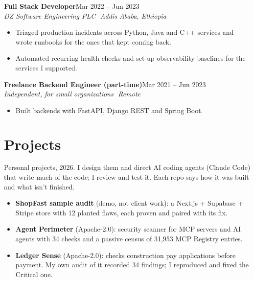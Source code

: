 \documentclass[10pt,letterpaper]{article}
\newcommand{\sep}{\,\textperiodcentered\,}
\newcommand{\role}[3]{%
  \textbf{#1}\hfill{\small #2}\\
  {\small\itshape #3}\par\vspace{1pt}}
\begin{document}
\role{Full Stack Developer}{Mar 2022 -- Jun 2023}{DZ Software Engineering PLC \sep Addis Ababa, Ethiopia}
\begin{itemize}
  \item Triaged production incidents across Python, Java and C++ services and wrote runbooks for the
  ones that kept coming back.
  \item Automated recurring health checks and set up observability baselines for
  the services I supported.
\end{itemize}
\vspace{1pt}

\role{Freelance Backend Engineer (part-time)}{Mar 2021 -- Jun 2023}{Independent, for small organizations \sep Remote}
\begin{itemize}
  \item Built backends with FastAPI, Django REST and Spring Boot.
\end{itemize}

\section{Projects}
{\small Personal projects, 2026. I design them and direct AI coding agents (Claude Code) that write much of
the code; I review and test it. Each repo says how it was built and what isn't finished.}
\begin{itemize}
  \item \textbf{ShopFast sample audit} (demo, not client work): a Next.js + Supabase + Stripe store with
  12 planted flaws, each proven and paired with its fix.
  \item \textbf{Agent Perimeter} (Apache-2.0): security scanner for MCP servers and AI agents with 34 checks
  and a passive census of 31,953 MCP Registry entries.
  \item \textbf{Ledger Sense} (Apache-2.0): checks construction pay applications before payment. My own
  audit of it recorded 34 findings; I reproduced and fixed the Critical one.
\end{itemize}

\end{document}
